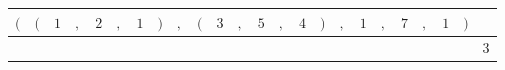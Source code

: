 {\scriptsize\setlength{\tabcolsep}{1.5pt}%
\begin{tabular}{ccccccccccccccccccccccc|l}
$($ & $($ & $\text{1}$ & $,$ & $\text{2}$ & $,$ & $\text{1}$ & $)$ & $,$ & $($ & $\text{3}$ & $,$ & $\text{5}$ & $,$ & $\text{4}$ & $)$ & $,$ & $\text{1}$ & $,$ & $\text{7}$ & $,$ & $\text{1}$ & $)$ & \\ \hline
\gcell{$$} & \gcell{$$} & \gcell{$\posD{\bullet}\sgn{-}$} & \gcell{$\posC{\circ}$} & \gcell{$\posD{\bullet}\sgn{-}$} & \gcell{$\posC{\circ}$} & \gcell{$\posD{\bullet}\sgn{-}$} & \gcell{$$} & \gcell{$\posC{\circ}$} & \gcell{$$} & \gcell{$\posD{\bullet}\sgn{+}$} & \gcell{$\posC{\circ}$} & \gcell{$\posD{\bullet}\sgn{?}$} & \gcell{$\posC{\circ}$} & \gcell{$\posD{\bullet}\sgn{+}$} & \gcell{$$} & \gcell{$\posC{\circ}$} & \gcell{$\posD{\bullet}\sgn{-}$} & \gcell{$\posC{\circ}$} & \gcell{$$} & \gcell{$\posC{\circ}$} & \gcell{$\posD{\bullet}\sgn{-}$} & \gcell{$$} & $\text{3}$ \\
\end{tabular}}
